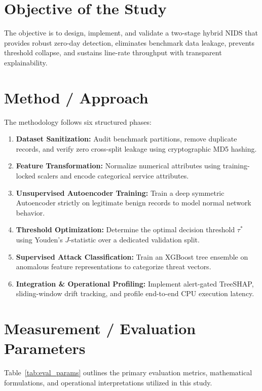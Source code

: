 \documentclass[12pt,a4paper]{report}
\begin{document}
\section{Objective of the Study}
The objective is to design, implement, and validate a two-stage hybrid NIDS that provides robust zero-day detection, eliminates benchmark data leakage, prevents threshold collapse, and sustains line-rate throughput with transparent explainability.

\section{Method / Approach}
The methodology follows six structured phases:
\begin{enumerate}
    \item \textbf{Dataset Sanitization:} Audit benchmark partitions, remove duplicate records, and verify zero cross-split leakage using cryptographic MD5 hashing.
    \item \textbf{Feature Transformation:} Normalize numerical attributes using training-locked scalers and encode categorical service attributes.
    \item \textbf{Unsupervised Autoencoder Training:} Train a deep symmetric Autoencoder strictly on legitimate benign records to model normal network behavior.
    \item \textbf{Threshold Optimization:} Determine the optimal decision threshold $\tau^*$ using Youden's $J$-statistic over a dedicated validation split.
    \item \textbf{Supervised Attack Classification:} Train an XGBoost tree ensemble on anomalous feature representations to categorize threat vectors.
    \item \textbf{Integration \& Operational Profiling:} Implement alert-gated TreeSHAP, sliding-window drift tracking, and profile end-to-end CPU execution latency.
\end{enumerate}

\section{Measurement / Evaluation Parameters}
Table~\ref{tab:eval_params} outlines the primary evaluation metrics, mathematical formulations, and operational interpretations utilized in this study.
\end{document}
